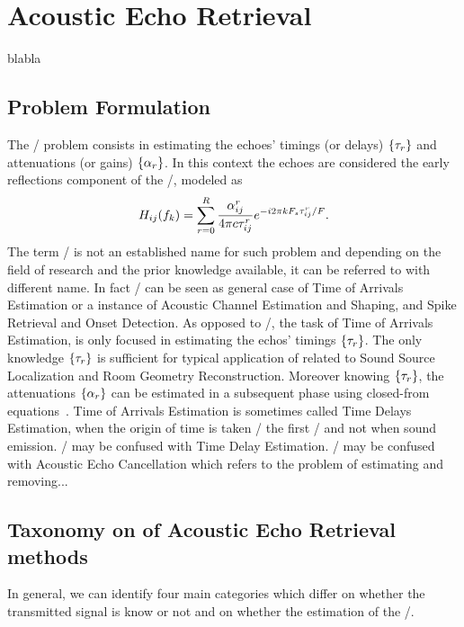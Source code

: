 \chapter{Acoustic Echo Retrieval}\label{chap:estimation}
\vspace{-2.5em}
  blabla

\section{Problem Formulation}
The \AERdef/ problem consists in estimating the echoes' timings (or delays) $\kbrace{\tau_r}$ and attenuations (or gains) $\kbrace{\alpha_r}$.
In this context the echoes are considered the early reflections component of the \RIR/, modeled as
\begin{equation}
     H_{ij}(f_k) = \sum_{r=0}^{R} \frac{\alpha_{ij}^r}{4 \pi c \tau_{ij}^r} {e}^{- {i} 2 \pi k F_s \tau_{ij}^r / F}
    .
\end{equation}
The term \AER/ is not an established name for such problem and depending on the field of research and the prior knowledge available, it can be referred to with different name.
In fact \AER/ can be seen as general case of Time of Arrivals Estimation or a instance of Acoustic Channel Estimation and Shaping, and Spike Retrieval and Onset Detection.
As opposed to \AER/, the task of Time of Arrivals Estimation, is only focused in estimating the echos' timings $\kbrace{\tau_r}$.
The only knowledge $\kbrace{\tau_r}$ is sufficient for typical application of related to Sound Source Localization and Room Geometry Reconstruction.
Moreover knowing $\kbrace{\tau_r}$, the attenuations $\kbrace{\alpha_r}$ can be estimated in a subsequent phase using closed-from equations~.
Time of Arrivals Estimation is sometimes called Time Delays Estimation, when the origin of time is taken \wrt/ the first \TOA/ and not when sound emission.
\AER/ may be confused with Time Delay Estimation.
\AER/ may be confused with Acoustic Echo Cancellation which refers to the problem of estimating and removing...

\section{Taxonomy on of Acoustic Echo Retrieval methods}

In general, we can identify four main categories which differ on whether the transmitted signal is know or not and on whether the estimation of the \RIR/.

